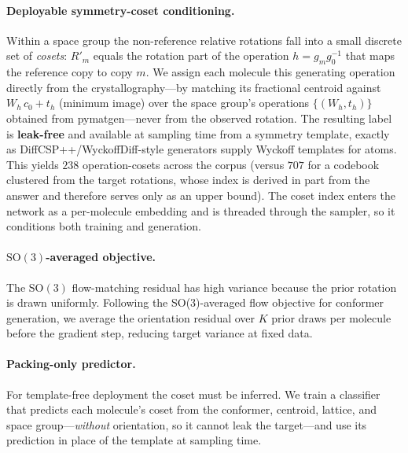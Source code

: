 \documentclass[10pt]{article}
\begin{document}
\paragraph{Deployable symmetry-coset conditioning.}
\label{sec:coset}
Within a space group the non-reference relative rotations fall into a small
discrete set of \emph{cosets}: $R'_m$ equals the rotation part of the operation
$h=g_mg_0^{-1}$ that maps the reference copy to copy $m$. We assign each molecule
this generating operation directly from the crystallography---by matching its
fractional centroid against $W_h\,c_0+t_h$ (minimum image) over the space
group's operations $\{(W_h,t_h)\}$ obtained from pymatgen---never from the
observed rotation. The resulting label is \textbf{leak-free} and available at
sampling time from a symmetry template, exactly as DiffCSP++/WyckoffDiff-style
generators supply Wyckoff templates for atoms\cite{jiao2024diffcsppp,wyckoffdiff2025}.
This yields $238$ operation-cosets across the corpus (versus $707$ for a codebook
clustered from the target rotations, whose index is derived in part from the
answer and therefore serves only as an upper bound). The coset index enters the
network as a per-molecule embedding and is threaded through the sampler, so it
conditions both training and generation.

\paragraph{$\mathrm{SO}(3)$-averaged objective.}
The $\mathrm{SO}(3)$ flow-matching residual has high variance because the prior
rotation is drawn uniformly. Following the SO(3)-averaged flow objective for
conformer generation\cite{cao2025so3averaged}, we average the orientation
residual over $K$ prior draws per molecule before the gradient step, reducing
target variance at fixed data.

\paragraph{Packing-only predictor.}
For template-free deployment the coset must be inferred. We train a classifier
that predicts each molecule's coset from the conformer, centroid, lattice, and
space group---\emph{without} orientation, so it cannot leak the target---and use
its prediction in place of the template at sampling time.
\end{document}
